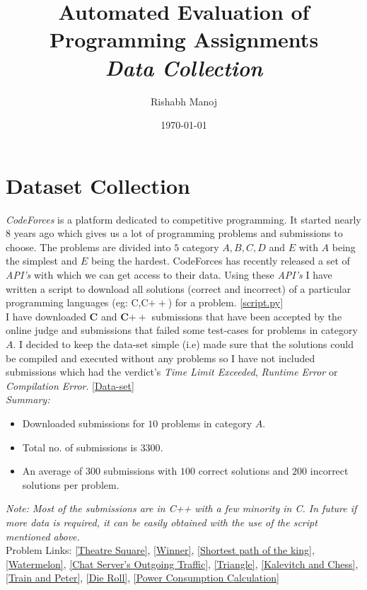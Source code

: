 \documentclass{article}
\title{Automated Evaluation of Programming Assignments \\ \vspace{0.5mm} \large\textit{Data Collection}}
\author{Rishabh Manoj}
\date{\today}
\begin{document}
\maketitle
\section{Dataset Collection}

\textit{CodeForces} is a platform dedicated to competitive programming. It started nearly $8$ years ago which gives us a lot of programming problems and submissions to choose. The problems are divided into $5$ category $A,B,C,D$ and $E$ with $A$ being the simplest and $E$ being the hardest. CodeForces has recently released a set of \textit{API's} with which we can get access to their data. Using these \textit{API's} I have written a script to download all solutions (correct and incorrect) of a particular programming languages (eg: C,C$++$) for a problem. \href{https://github.com/Perseus14/Automated-Evaluation-of-Programming-Assignments/blob/master/Data/cf_script.py}{[script.py]}\\

I have downloaded \textbf{C} and \textbf{C$++$} submissions that have been accepted by the online judge and submissions that failed some test-cases for problems in category $A$. I decided to keep the data-set simple (i.e) made sure that the solutions could be compiled and executed without any problems so I have not included submissions which had the  verdict's \textit{Time Limit Exceeded}, \textit{Runtime Error} or \textit{Compilation Error}. \href{https://github.com/Perseus14/Automated-Evaluation-of-Programming-Assignments/tree/master/Data/CodeForces}{[Data-set]}\\ 

\textit{Summary:}
\begin{itemize}
    \item Downloaded submissions for $10$ problems in category $A$.
    \item Total no. of submissions is $3300$.
    \item An average of $300$ submissions with $100$ correct solutions and $200$ incorrect solutions per problem. 
\end{itemize}

\textit{Note: Most of the submissions are in C++ with a few minority in C. In future if more data is required, it can be easily obtained with the use of the script mentioned above.
}\\

Problem Links: \href{http://codeforces.com/contest/1/problem/A}{[Theatre Square]}, 
\href{http://codeforces.com/contest/2/problem/A}{[Winner]},
\href{http://codeforces.com/contest/3/problem/A}{[Shortest path of the king]}, 
\href{http://codeforces.com/contest/4/problem/A}{[Watermelon]}, 
\href{http://codeforces.com/contest/5/problem/A}{[Chat Server's Outgoing Traffic]}, 
\href{http://codeforces.com/contest/6/problem/A}{[Triangle]}, 
\href{http://codeforces.com/contest/7/problem/A}{[Kalevitch and Chess]}, 
\href{http://codeforces.com/contest/8/problem/A}{[Train and Peter]}, 
\href{http://codeforces.com/contest/9/problem/A}{[Die Roll]}, 
\href{http://codeforces.com/contest/10/problem/A}{[Power Consumption Calculation]}
\end{document}
